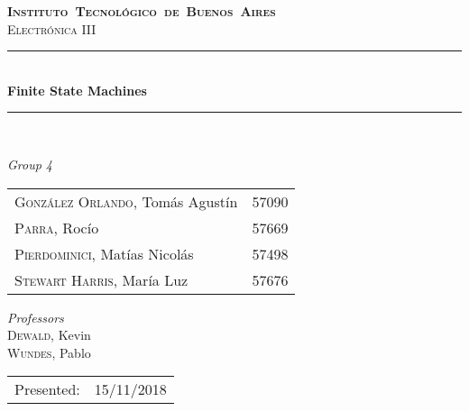 \begin{titlepage}
\newcommand{\HRule}{\rule{\linewidth}{0.5mm}}
\center
\mbox{\textsc{\LARGE \bfseries {Instituto Tecnol\'ogico de Buenos Aires}}}\\[1.5cm]
\textsc{\Large Electr\'onica III}\\[0.5cm]


\HRule \\[0.6cm]
{ \Huge \bfseries   Finite State Machines}\\[0.4cm] %
\HRule \\[1.5cm]


{\large

\emph{Group 4}\\
\vspace{3px}

\begin{tabular}{lr} 	
\textsc{Gonz\'alez Orlando}, Tom\'as Agust\'in  & 57090 \\
\textsc{Parra}, Roc\'io  & 57669 \\ 	
\textsc{Pierdominici}, Mat\'ias Nicol\'as & 57498 \\
\textsc{Stewart Harris}, Mar\'ia Luz  & 57676 \\ 	     
\end{tabular}

\vspace{20px}

\emph{Professors}\\
\vspace{3px}
\textsc{Dewald,} Kevin\\ 	
\textsc{Wundes,} Pablo\\

\vspace{100px}

\begin{tabular}{ll}

Presented: & 15/11/2018\\

\end{tabular}

}

\vfill

\end{titlepage}